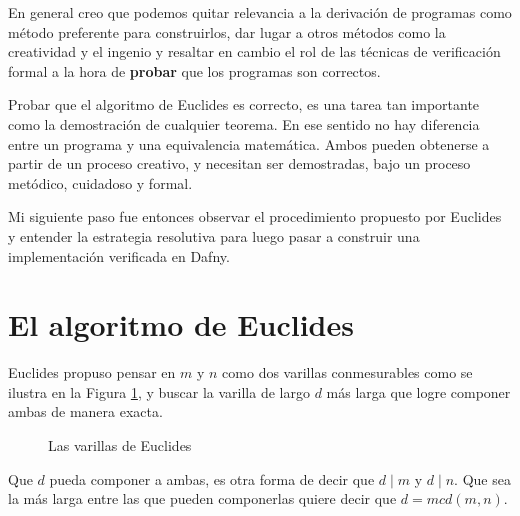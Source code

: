 \documentclass[12pt, a4paper, openany, fleqn]{book}
\begin{document}
    En general creo que podemos quitar relevancia a la derivación de programas como método preferente para construirlos, dar lugar a otros métodos como la creatividad y el ingenio y resaltar en cambio el rol de las técnicas de verificación formal a la hora de \textbf{probar} que los programas son correctos.

    Probar que el algoritmo de Euclides es correcto, es una tarea tan importante como la demostración de cualquier teorema. En ese sentido no hay diferencia entre un programa y una equivalencia matemática. Ambos pueden obtenerse a partir de un proceso creativo, y necesitan ser demostradas, bajo un proceso metódico, cuidadoso y formal.

    Mi siguiente paso fue entonces observar el procedimiento propuesto por Euclides y entender la estrategia resolutiva para luego pasar a construir una implementación verificada en Dafny.

    \section{El algoritmo de Euclides}
    \label{desarrollo_euclides}
    Euclides propuso pensar en $m$ y $n$ como dos varillas conmesurables como se ilustra en la Figura \ref{varillas_euclides}, y buscar la varilla de largo $d$ más larga que logre componer ambas de manera exacta.

    \begin{figure}[h]
        \centering
        \caption{Las varillas de Euclides} \label{varillas_euclides}
    \end{figure}

    Que $d$ pueda componer a ambas, es otra forma de decir que $d \mid m$ y $d \mid n$. Que sea la más larga entre las que pueden componerlas quiere decir que $d = mcd(m,n)$.
\end{document}
